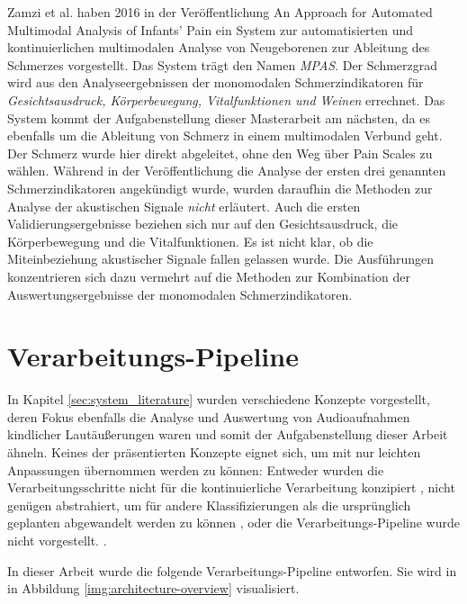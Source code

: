 Zamzi et al.  haben 2016 in der Veröffentlichung \glqq An Approach for Automated Multimodal Analysis of Infants' Pain\grqq{} \cite{zamziMultimodal} ein System zur automatisierten und kontinuierlichen multimodalen Analyse von Neugeborenen zur Ableitung des Schmerzes vorgestellt. Das System trägt den Namen \emph{MPAS}. Der Schmerzgrad wird aus den Analyseergebnissen der monomodalen Schmerzindikatoren für \emph{Gesichtsausdruck, Körperbewegung, Vitalfunktionen und Weinen} errechnet. Das System kommt der Aufgabenstellung dieser Masterarbeit am nächsten, da es ebenfalls um die Ableitung von Schmerz in einem multimodalen Verbund geht. Der Schmerz wurde hier \glqq direkt\grqq{} abgeleitet, ohne den Weg über Pain Scales zu wählen. Während in der Veröffentlichung die Analyse der ersten drei genannten Schmerzindikatoren angekündigt wurde, wurden daraufhin die Methoden zur Analyse der akustischen Signale \emph{nicht} erläutert. Auch die ersten Validierungsergebnisse beziehen sich nur auf den Gesichtsausdruck, die Körperbewegung und die Vitalfunktionen. Es ist nicht klar, ob die Miteinbeziehung akustischer Signale fallen gelassen wurde. Die Ausführungen konzentrieren sich dazu vermehrt auf die Methoden zur Kombination der Auswertungsergebnisse der monomodalen Schmerzindikatoren.

\section{Verarbeitungs-Pipeline}
\label{sec:pipeline}

In Kapitel \ref{sec:system_literature} wurden verschiedene Konzepte vorgestellt, deren Fokus ebenfalls die Analyse und Auswertung von Audioaufnahmen kindlicher Lautäußerungen waren und somit der Aufgabenstellung dieser Arbeit ähneln. Keines der präsentierten Konzepte eignet sich, um mit nur leichten Anpassungen übernommen werden zu können: Entweder wurden die Verarbeitungsschritte nicht für die kontinuierliche Verarbeitung konzipiert \cite{class_abdulaziz} \cite{comparisonOfLearning} \cite{cry_thesis}, nicht genügen abstrahiert, um für andere Klassifizierungen als die ursprünglich geplanten abgewandelt werden zu können \cite{cohenCry}, oder die Verarbeitungs-Pipeline wurde nicht vorgestellt. \cite{palEmotion} \cite{zamziMultimodal}.

In dieser Arbeit wurde die folgende Verarbeitungs-Pipeline entworfen. Sie wird in in Abbildung \ref{img:architecture-overview} visualisiert. 

